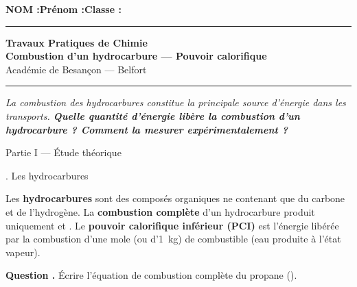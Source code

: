 \documentclass[11pt,a4paper]{article}
\newcommand{\sectitle}[1]{%
  \vspace{6pt}
  \noindent\colorbox{exoheader}{\parbox{\dimexpr\linewidth-2\fboxsep}%
    {\color{white}\bfseries\large\strut\quad #1}}
  \vspace{4pt}
}
\newcommand{\subsectitle}[1]{%
  \vspace{4pt}
  \noindent\colorbox{exolight}{\parbox{\dimexpr\linewidth-2\fboxsep}%
    {\color{exoheader}\bfseries\strut\quad #1}}
  \vspace{2pt}
}
\newcounter{question}
\newcommand{\question}{%
  \stepcounter{question}%
  \noindent\textcolor{exoheader}{\textbf{Question \thequestion.}}\quad
}
\begin{document}
\noindent\textbf{NOM :}\hfill\textbf{Prénom :}\hfill\textbf{Classe :}\hfill\phantom{x}\\[0.2cm]
\hrule\vspace{0.2cm}

\begin{center}
  {\large\bfseries\textcolor{exoheader}{Travaux Pratiques de Chimie}}\\[4pt]
  {\LARGE\bfseries Combustion d'un hydrocarbure --- Pouvoir calorifique}\\[2pt]
  {\small Académie de Besançon --- Belfort}
\end{center}
\hrule\vspace{6pt}

\begin{tcolorbox}[enhanced, colback=problemebg, colframe=exoheader, boxrule=1.5pt,
  title={\faFlask\quad Problématique},
  fonttitle=\bfseries\color{white},
  attach boxed title to top left={yshift=-2mm, xshift=4mm},
  boxed title style={colback=exoheader, colframe=exoheader}]
\textit{La combustion des hydrocarbures constitue la principale source d'énergie dans les transports.
\textbf{Quelle quantité d'énergie libère la combustion d'un hydrocarbure ?
Comment la mesurer expérimentalement ?}}
\end{tcolorbox}

\vspace{6pt}

\sectitle{Partie I --- Étude théorique}

\subsectitle{1. Les hydrocarbures}

\begin{mdframed}[backgroundcolor=exolight, linecolor=exoheader, linewidth=1.2pt]
Les \textbf{hydrocarbures} sont des composés organiques ne contenant que du carbone et de l'hydrogène.
La \textbf{combustion complète} d'un hydrocarbure produit uniquement  et .
Le \textbf{pouvoir calorifique inférieur (PCI)} est l'énergie libérée par la combustion
d'une mole (ou d'1~kg) de combustible (eau produite à l'état vapeur).
\end{mdframed}

\vspace{4pt}
\question Écrire l'équation de combustion complète du propane (). \dotfill

\vspace{0.3cm}\noindent\dotfill
\end{document}
